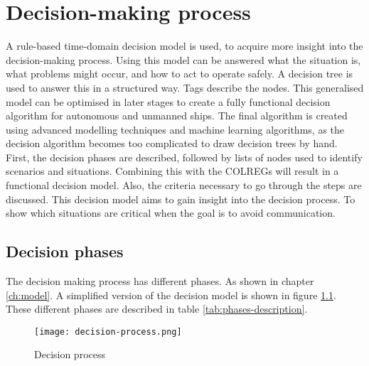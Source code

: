 \chapter{ Decision-making process}
\label{ch:decision-process}
A rule-based time-domain decision model is used, to acquire more insight into the decision-making process. Using this model can be answered what the situation is, what problems might occur, and how to act to operate safely. A decision tree is used to answer this in a structured way. Tags describe the nodes. This generalised model can be optimised in later stages to create a fully functional decision algorithm for autonomous and unmanned ships. The final algorithm is created using advanced modelling techniques and machine learning algorithms, as the decision algorithm becomes too complicated to draw decision trees by hand. First, the decision phases are described, followed by lists of nodes used to identify scenarios and situations. Combining this with the COLREGs will result in a functional decision model. Also, the criteria necessary to go through the steps are discussed. This decision model aims to gain insight into the decision process. To show which situations are critical when the goal is to avoid communication.

\section{Decision phases}
The decision making process has different phases. As shown in chapter \ref{ch:model}. A simplified version of the decision model is shown in figure \ref{fig:decision-process}. These different phases are described in table \ref{tab:phases-description}.

\begin{figure}[hb]
	\centering
	\texttt{[image: decision-process.png]}
	\caption{Decision process}
	\label{fig:decision-process}
\end{figure}

